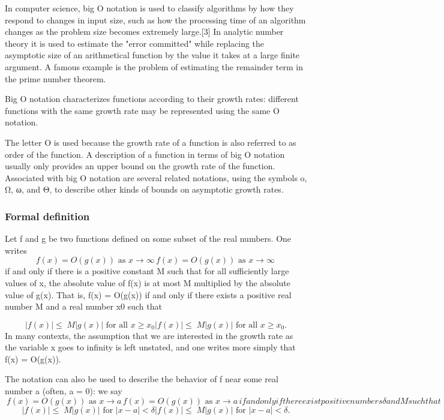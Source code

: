 \documentclass{beamer}
\begin{document}
\begin{frame}
In computer science, big O notation is used to classify algorithms by how they respond to changes in input size, such as how the processing time of an algorithm changes as the problem size becomes extremely large.[3] In analytic number theory it is used to estimate the "error committed" while replacing the asymptotic size of an arithmetical function by the value it takes at a large finite argument. A famous example is the problem of estimating the remainder term in the prime number theorem.
\end{frame}
\begin{frame}

Big O notation characterizes functions according to their growth rates: different functions with the same growth rate may be represented using the same O notation.

The letter O is used because the growth rate of a function is also referred to as order of the function. A description of a function in terms of big O notation usually only provides an upper bound on the growth rate of the function. Associated with big O notation are several related notations, using the symbols o, Ω, ω, and Θ, to describe other kinds of bounds on asymptotic growth rates.
\end{frame}
\begin{frame}
\frametitle{Formal definition}
Let f and g be two functions defined on some subset of the real numbers. One writes
\[
{\displaystyle f(x)=O(g(x)){\text{ as }}x\to \infty \,} f(x)=O(g(x)){\text{ as }}x\to \infty \,
\]
if and only if there is a positive constant M such that for all sufficiently large values of x, the absolute value of f(x) is at most M multiplied by the absolute value of g(x). That is, f(x) = O(g(x)) if and only if there exists a positive real number M and a real number x0 such that
\end{frame}
\begin{frame}
\[{\displaystyle |f(x)|\leq \;M|g(x)|{\text{ for all }}x\geq x_{0}} {\displaystyle |f(x)|\leq \;M|g(x)|{\text{ for all }}x\geq x_{0}}.\]
In many contexts, the assumption that we are interested in the growth rate as the variable x goes to infinity is left unstated, and one writes more simply that f(x) = O(g(x)).
\end{frame}
\begin{frame}

The notation can also be used to describe the behavior of f near some real number a (often, a = 0): we say
\[\
{\displaystyle f(x)=O(g(x)){\text{ as }}x\to a\,} f(x)=O(g(x)){\text{ as }}x\to a\,
if and only if there exist positive numbers δ and M such that
\]
\[
{\displaystyle |f(x)|\leq \;M|g(x)|{\text{ for }}|x-a|<\delta } {\displaystyle |f(x)|\leq \;M|g(x)|{\text{ for }}|x-a|<\delta }.
\]
\end{frame}
\end{document}
